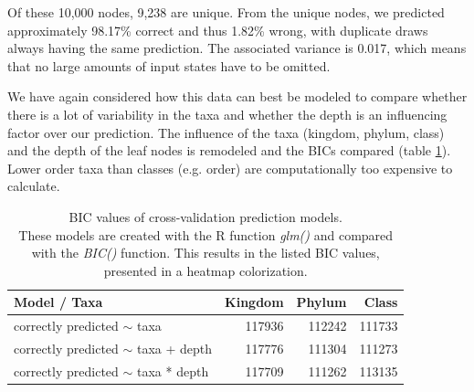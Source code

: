       Of these 10,000 nodes, 9,238 are unique. From the unique nodes, we predicted approximately 
        98.17\% correct and thus 1.82\% wrong, with duplicate draws always having the same prediction. 
        The associated variance is 0.017, which means that no large amounts of input states have to be 
        omitted.
      
      We have again considered how this data can best be modeled to compare whether there is a lot 
        of variability in the taxa and whether the depth is an influencing factor over our prediction. 
        The influence of the taxa (kingdom, phylum, class) and the depth of the leaf nodes is remodeled 
        and the BICs compared (table \ref{table:BIC cross-validation}). Lower order taxa than classes 
        (e.g. order) are computationally too expensive to calculate.


      \begin{table}[h]
        \begin{center}
          \begin{tabular}{ |l|r|r|r| }
            \hline
            \bfseries Model / Taxa & \bfseries Kingdom & \bfseries Phylum & \bfseries Class \\%
            \hline \hline
            correctly predicted $\sim$ taxa & 117936 & {\cellcolor{green!40}}112242 & {\cellcolor{green!50}}111733 \\%
            \hline
            correctly predicted $\sim$ taxa + depth & 117776 & {\cellcolor{green!50}}111304 & {\cellcolor{green!50}}111273 \\%
            \hline
            correctly predicted $\sim$ taxa * depth & 117709 & {\cellcolor{green!50}}111262 & {\cellcolor{green!30}}113135 \\%
            \hline
          \end{tabular} 
        \end{center}
        \caption{BIC values of cross-validation prediction models. \\
          These models are created with the R function \textit{glm()} and compared with the 
            \textit{BIC()} function. This results in the listed BIC values, presented in a heatmap colorization.}
        \label{table:BIC cross-validation} 
      \end{table}

